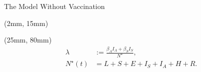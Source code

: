\begin{frame}{The Model Without Vaccination}
        \setlength{\leftmargini}{1mm}
    \begin{textblock*}{65mm}(2mm, 15mm)
    \end{textblock*}
    \begin{textblock*}{65mm}(25mm, 80mm)
        \begin{equation*}
            \begin{aligned}
                \lambda &:=
                    \frac{\beta_A I_A + \beta_S I_S}{N^{\star}},
                \\
                N^{\star}(t) &=
                    L + S + E +
                    I_S + I_A +
                    H + R .
            \end{aligned}
        \end{equation*}
    \end{textblock*}
\end{frame}